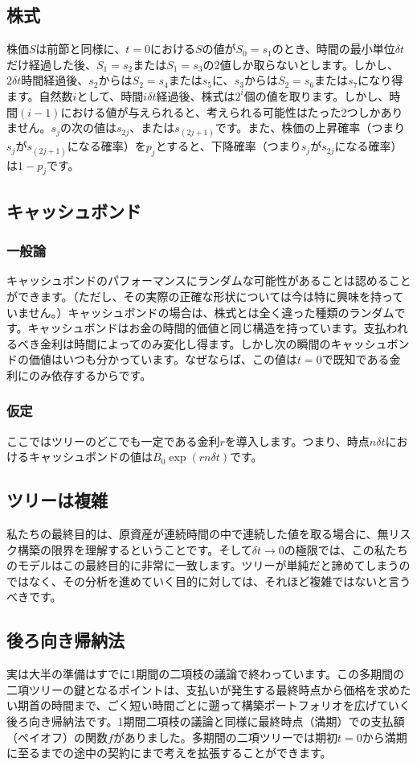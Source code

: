 \documentclass[uplatex,a4j,12pt,dvipdfmx]{jsarticle}
\begin{document}
\subsection{株式}
株価$S$は前節と同様に、$t=0$における$S$の値が$S_0 = s_1$のとき、時間の最小単位$\delta t$だけ経過した後、$S_1=s_2$または$S_1=s_3$の2値しか取らないとします。しかし、$2\delta t$時間経過後、$s_2$からは$S_2=s_4$または$s_5$に、$s_3$からは$S_2=s_6$または$s_7$になり得ます。自然数$i$として、時間$i\delta t$経過後、株式は$2^i$個の値を取ります。しかし、時間$(i-1)$における値が与えられると、考えられる可能性はたった2つしかありません。$s_j$の次の値は$s_{2j}$、または$s_{(2j+1)}$です。また、株価の上昇確率（つまり$s_j$が$s_{(2j+1)}$になる確率）を$p_j$とすると、下降確率（つまり$s_j$が$s_{2j}$になる確率）は$1-p_j$です。

\subsection{キャッシュボンド}
\subsubsection{一般論}
キャッシュボンドのパフォーマンスにランダムな可能性があることは認めることができます。（ただし、その実際の正確な形状については今は特に興味を持っていません。）キャッシュボンドの場合は、株式とは全く違った種類のランダムです。キャッシュボンドはお金の時間的価値と同じ構造を持っています。支払われるべき金利は時間によってのみ変化し得ます。しかし次の瞬間のキャッシュボンドの価値はいつも分かっています。なぜならば、この値は$t=0$で既知である金利にのみ依存するからです。
\subsubsection{仮定}
ここではツリーのどこでも一定である金利$r$を導入します。つまり、時点$n\delta t$におけるキャッシュボンドの値は$B_0 \exp(rn\delta t)$です。

\subsection{ツリーは複雑}
私たちの最終目的は、原資産が連続時間の中で連続した値を取る場合に、無リスク構築の限界を理解するということです。そして$\delta t \to 0$の極限では、この私たちのモデルはこの最終目的に非常に一致します。ツリーが単純だと諦めてしまうのではなく、その分析を進めていく目的に対しては、それほど複雑ではないと言うべきです。

\subsection{後ろ向き帰納法}
実は大半の準備はすでに1期間の二項枝の議論で終わっています。この多期間の二項ツリーの鍵となるポイントは、支払いが発生する最終時点から価格を求めたい期首の時間まで、ごく短い時間ごとに遡って構築ポートフォリオを広げていく後ろ向き帰納法です。1期間二項枝の議論と同様に最終時点（満期）での支払額（ペイオフ）の関数$f$がありました。多期間の二項ツリーでは期初$t=0$から満期に至るまでの途中の契約にまで考えを拡張することができます。
\end{document}
